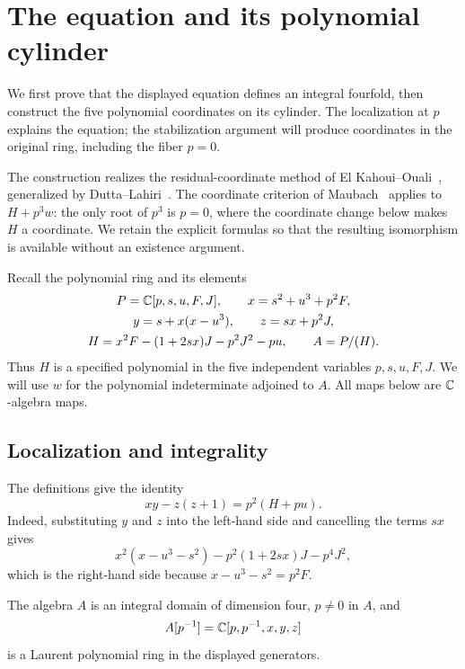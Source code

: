 \section{The equation and its polynomial cylinder}\label{sec:construction}

We first prove that the displayed equation defines an integral fourfold,
then construct the five polynomial coordinates on its cylinder. The
localization at $p$ explains the equation; the stabilization argument
will produce coordinates in the original ring, including the fiber
$p=0$.

The construction realizes the residual-coordinate method of
El Kahoui--Ouali~\cite[Lemma~3.1 and Theorem~1.1]{ElKahouiOuali},
generalized by Dutta--Lahiri~\cite[Lemma~3.3 and Theorem~3.4]{DuttaLahiri}.
The coordinate criterion of Maubach~\cite[Theorem~4.5]{Maubach}
applies to $H+p^3w$: the only root of $p^3$ is $p=0$, where
the coordinate change below makes $H$ a coordinate. We retain the
explicit formulas so that the resulting isomorphism is available
without an existence argument.

Recall the polynomial ring and its elements
\begin{equation}\label{con:setup}
\begin{gathered}
 P=\mathbb C[p,s,u,F,J],\qquad x=s^2+u^3+p^2F,\\
 y=s+x(x-u^3),\qquad z=sx+p^2J,\\
 H=x^2F-(1+2sx)J-p^2J^2-pu,\qquad A=P/(H).
\end{gathered}
\end{equation}
Thus \(H\) is a specified polynomial in the five independent variables
\(p,s,u,F,J\). We will use \(w\) for the polynomial indeterminate adjoined
to \(A\). All maps below are \(\mathbb C\)-algebra maps.

\subsection{Localization and integrality}

The definitions give the identity
\begin{equation}\label{con:identity}
 xy-z(z+1)=p^2(H+pu).
\end{equation}
Indeed, substituting \(y\) and \(z\) into the left-hand side and cancelling
the terms \(sx\) gives
\[
 x^2(x-u^3-s^2)-p^2(1+2sx)J-p^4J^2,
\]
which is the right-hand side because \(x-u^3-s^2=p^2F\).

\begin{lemma}\label{con:domain}
The algebra \(A\) is an integral domain of dimension four, \(p\ne0\)
in \(A\), and
\[
 A[p^{-1}]=\mathbb C[p,p^{-1},x,y,z]
\]
is a Laurent polynomial ring in the displayed generators.
\end{lemma}

